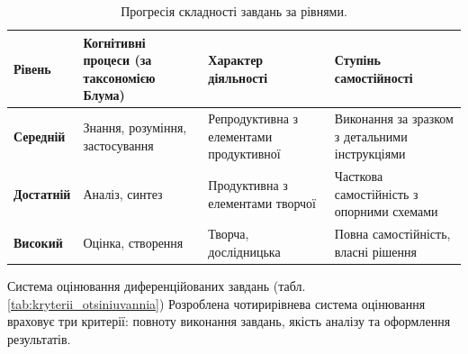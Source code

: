 \begin{table}[h!]
\caption{Прогресія складності завдань за рівнями.}
\label{tab:progresiia_skladnosti} 
\setlength \tabcolsep {0.5\tabcolsep }
\centering
\begin{tabular}{|m{}|m{}|m{}|m{}|}
\hline
\textbf{Рівень} & 
\textbf{Когнітивні процеси (за таксономією Блума)} & 
\textbf{Характер діяльності} & 
\textbf{Ступінь самостійності} \\ 
\hline

\textbf{Середній} & 
Знання, розуміння, застосування & 
Репродуктивна з елементами продуктивної & 
Виконання за зразком з детальними інструкціями \\ 
\hline

\textbf{Достатній} & 
Аналіз, синтез & 
Продуктивна з елементами творчої & 
Часткова самостійність з опорними схемами \\ 
\hline

\textbf{Високий} & 
Оцінка, створення & 
Творча, дослідницька & 
Повна самостійність, власні рішення \\ 
\hline
\end{tabular}
\end{table}




Система оцінювання диференційованих завдань (табл. \ref{tab:kryterii_otsiniuvannia})
Розроблена чотирирівнева система оцінювання враховує три критерії: повноту виконання завдань, якість аналізу та оформлення результатів.

